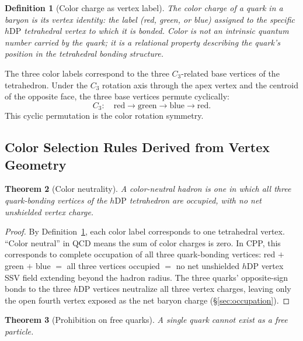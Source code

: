 \documentclass[12pt]{article}
\newtheorem{theorem}{Theorem}[section]
\newtheorem{definition}[theorem]{Definition}
\newcommand{\hDP}{h\mathrm{DP}}
\begin{document}
\begin{definition}[Color charge as vertex label]
\label{def:color}
The color charge of a quark in a baryon is its vertex identity:
the label (red, green, or blue) assigned to the specific $\hDP$
tetrahedral vertex to which it is bonded.  Color is not an intrinsic
quantum number carried by the quark; it is a relational property
describing the quark's position in the tetrahedral bonding structure.
\end{definition}

The three color labels correspond to the three $C_3$-related base
vertices of the tetrahedron.  Under the $C_3$ rotation axis through
the apex vertex and the centroid of the opposite face, the three
base vertices permute cyclically:
\begin{equation}
C_3: \quad \text{red} \to \text{green} \to \text{blue} \to \text{red}.
\label{eq:C3_permutation}
\end{equation}
This cyclic permutation is the color rotation symmetry.

\subsection{Color Selection Rules Derived from Vertex Geometry}

\begin{theorem}[Color neutrality]
\label{thm:color_neutral}
A color-neutral hadron is one in which all three quark-bonding
vertices of the $\hDP$ tetrahedron are occupied, with no net
unshielded vertex charge.
\end{theorem}

\begin{proof}
By Definition~\ref{def:color}, each color label corresponds to one
tetrahedral vertex.  ``Color neutral'' in QCD means the sum of color
charges is zero.  In CPP, this corresponds to complete occupation of
all three quark-bonding vertices: red $+$ green $+$ blue $= $ all
three vertices occupied $=$ no net unshielded $\hDP$ vertex SSV
field extending beyond the hadron radius.  The three quarks'
opposite-sign bonds to the three $\hDP$ vertices neutralize all
three vertex charges, leaving only the open fourth vertex exposed
as the net baryon charge (§\ref{sec:occupation}).
\end{proof}

\begin{theorem}[Prohibition on free quarks]
\label{thm:no_free_quark}
A single quark cannot exist as a free particle.
\end{theorem}
\end{document}
